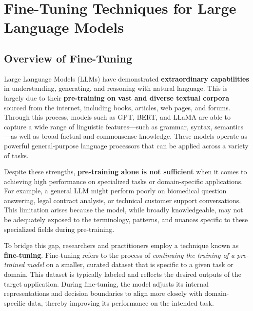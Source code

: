 \chapter{Fine-Tuning Techniques for Large Language Models}

\section{Overview of Fine-Tuning}

Large Language Models (LLMs) have demonstrated \textbf{extraordinary capabilities} in understanding, generating, and reasoning with natural language. This is largely due to their \textbf{pre-training on vast and diverse textual corpora} sourced from the internet, including books, articles, web pages, and forums. Through this process, models such as GPT, BERT, and LLaMA are able to capture a wide range of linguistic features—such as grammar, syntax, semantics—as well as broad factual and commonsense knowledge. These models operate as powerful general-purpose language processors that can be applied across a variety of tasks.

\vspace{0.5cm}

Despite these strengths, \textbf{pre-training alone is not sufficient} when it comes to achieving high performance on specialized tasks or domain-specific applications. For example, a general LLM might perform poorly on biomedical question answering, legal contract analysis, or technical customer support conversations. This limitation arises because the model, while broadly knowledgeable, may not be adequately exposed to the terminology, patterns, and nuances specific to these specialized fields during pre-training.

\vspace{0.5cm}

To bridge this gap, researchers and practitioners employ a technique known as \textbf{fine-tuning}. Fine-tuning refers to the process of \emph{continuing the training of a pre-trained model} on a smaller, curated dataset that is specific to a given task or domain. This dataset is typically labeled and reflects the desired outputs of the target application. During fine-tuning, the model adjusts its internal representations and decision boundaries to align more closely with domain-specific data, thereby improving its performance on the intended task.

\vspace{0.5cm}

